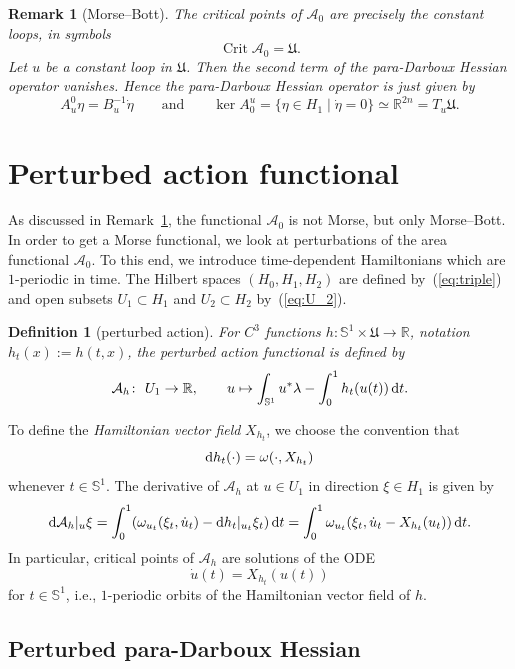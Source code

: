 \documentclass[pdftex]{sigma}
\numberwithin{equation}{section}
\newtheorem{Definition}[Theorem]{Definition}
\newtheorem{Remark}[Theorem]{Remark}
\newcommand{\R}{{\mathbb{R}}}
\renewcommand{\SS}{{\mathbb{S}}}
\newcommand{\Aa}{{\mathcal{A}}} %
\newcommand{\Crit}{\operatorname{Crit}} %
\newcommand{\1}{{{\mathchoice {\rm 1\mskip-4mu l} {\rm 1\mskip-4mu l}
{\rm 1\mskip-4.5mu l} {\rm 1\mskip-5mu l}}}}
\begin{document}
\begin{Remark}[Morse--Bott]\label{rem:Morse--Bott}
The critical points of $\Aa_0$ are precisely the constant loops, in symbols
\[
 \Crit\Aa_0=\mathfrak{U}.
\]
Let $u$ be a constant loop in $\mathfrak{U}$.
Then the second term of the para-Darboux Hessian operator vanishes.
Hence the para-Darboux Hessian operator is just given by
\[
A_u^0\eta=B_u^{-1}\dot\eta \qquad \text{and} \qquad
 \ker A_0^u=\{\eta\in H_1\mid \dot \eta=0\}
 \simeq \R^{2n}
 =T_u\mathfrak{U}
.\]
\end{Remark}

\section{Perturbed action functional}

As discussed in Remark~\ref{rem:Morse--Bott},
the functional $\Aa_0$ is not Morse, but only Morse--Bott.
In order to get a Morse functional, we look at perturbations
of the area functional $\Aa_0$.
To this end, we introduce time-dependent Hamiltonians
which are $1$-periodic in time.
The Hilbert spaces $(H_0,H_1,H_2)$ are defined by~(\ref{eq:triple})
and open subsets $U_1\subset H_1$ and $U_2\subset H_2$ by~(\ref{eq:U_2}).

\begin{Definition}[perturbed action]
For $C^3$ functions $h\colon\SS^1\times\mathfrak{U}\to\R$,
notation $h_t(x):=h(t,x)$,
the \textit{perturbed action functional} is defined by
\[
 \Aa_h\colon\ U_1\to\R
 ,\qquad
 u\mapsto\int_{\SS^1}u^*\lambda-\int_0^1 h_t(u(t))\, {\rm d}t .
\]
\end{Definition}

To define the \textit{Hamiltonian vector field} $X_{h_t}$, we choose the
convention that
\[
 {\rm d}h_t(\cdot)=\omega(\cdot,X_{h_t})
\]
whenever $t\in\SS^1$.
%
The derivative of $\Aa_h$ at $u\in U_1$ in direction $\xi\in H_1$ is
given by
\[
 {\rm d}\Aa_h|_u\xi
 =\int_0^1 (\omega_{u_t}(\xi_t,\dot u_t)
 -{\rm d}h_t|_{u_t}\xi_t )\, {\rm d}t
 =\int_0^1\omega_{u_t}(\xi_t,\dot u_t-X_{h_t}(u_t))\, {\rm d}t .
\]
In particular, critical points of $\Aa_h$ are
solutions of the ODE
\[
 \dot u(t)=X_{h_t}(u(t))
\]
for $t\in\SS^1$, i.e., $1$-periodic orbits of the Hamiltonian vector
field of $h$.



\subsection{Perturbed para-Darboux Hessian}
\end{document}
